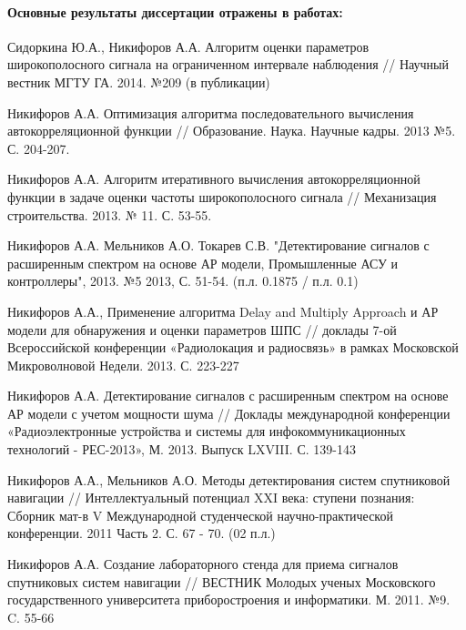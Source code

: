 \paragraph{Основные результаты диссертации отражены в работах:}
\begin{enumerate}
	{\bf{
	\item Сидоркина Ю.А., Никифоров А.А. Алгоритм оценки параметров широкополосного сигнала на ограниченном интервале наблюдения //
		Научный вестник МГТУ ГА. 2014. №209 (в публикации)
	\item Никифоров А.А. Оптимизация алгоритма последовательного вычисления автокорреляционной функции //
		Образование. Наука. Научные кадры. 2013 №5. С. 204-207.
	\item Никифоров А.А. Алгоритм итеративного вычисления автокорреляционной функции в задаче оценки частоты широкополосного сигнала //
		Механизация строительства. 2013. № 11. С. 53-55.
	\item Никифоров А.А. Мельников А.О. Токарев С.В. "Детектирование сигналов с расширенным спектром на основе АР модели,
		Промышленные АСУ и контроллеры", 2013. №5 2013, С. 51-54. (п.л. 0.1875 / п.л. 0.1)
	}}

	\item Никифоров А.А., Применение алгоритма Delay and Multiply Approach и АР модели для обнаружения и оценки параметров ШПС //
		доклады 7-ой Всероссийской конференции «Радиолокация и радиосвязь» в рамках Московской Микроволновой Недели. 2013. С. 223-227 
	\item Никифоров А.А. Детектирование сигналов с расширенным спектром на основе АР модели с учетом мощности шума // Доклады международной конференции
		«Радиоэлектронные устройства и системы для инфокоммуникационных технологий - РЕС-2013», М. 2013. Выпуск LXVIII. С. 139-143
	\item Никифоров А.А., Мельников А.О. Методы детектирования систем спутниковой навигации // Интеллектуальный потенциал XXI века:
		ступени познания: Сборник мат-в V Международной студенческой научно-практической конференции. 2011 Часть 2. С. 67 - 70. (02 п.л.)

	\item Никифоров А.А. Создание лабораторного стенда для приема сигналов спутниковых систем навигации // ВЕСТНИК Молодых ученых Московского
		государственного университета приборостроения и информатики. М. 2011. №9. C. 55-66
\end{enumerate}
